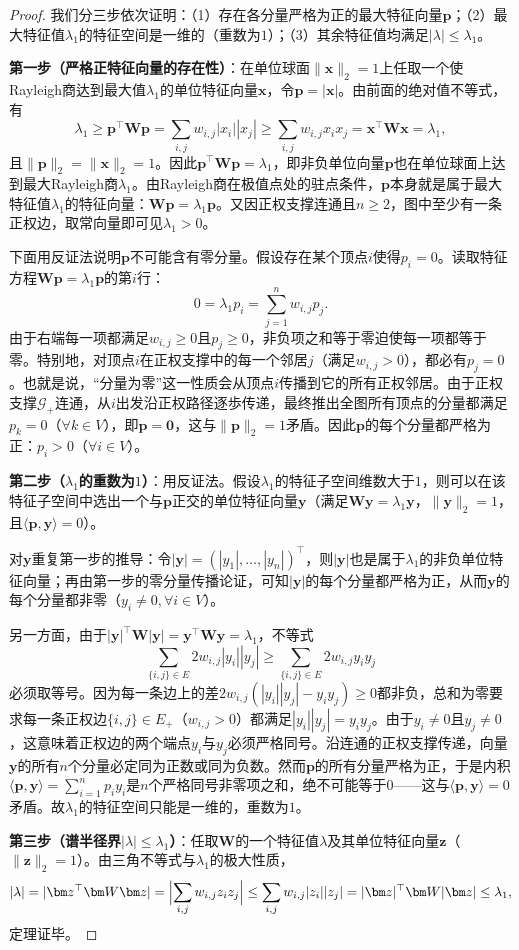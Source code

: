 \begin{proof}
我们分三步依次证明：（1）存在各分量严格为正的最大特征向量$\bm p$；（2）最大特征值$\lambda_1$的特征空间是一维的（重数为$1$）；（3）其余特征值均满足$|\lambda|\leq\lambda_1$。

\textbf{第一步（严格正特征向量的存在性）}：在单位球面$\|\bm x\|_2=1$上任取一个使Rayleigh商达到最大值$\lambda_1$的单位特征向量$\bm x$，令$\bm p=|\bm x|$。由前面的绝对值不等式，有
\[
\lambda_1\geq\bm p^\top\bm W\bm p
=\sum_{i,j}w_{i,j}|x_i||x_j|
\geq\sum_{i,j}w_{i,j}x_i x_j
=\bm x^\top\bm W\bm x=\lambda_1,
\]
且$\|\bm p\|_2=\|\bm x\|_2=1$。因此$\bm p^\top\bm W\bm p=\lambda_1$，即非负单位向量$\bm p$也在单位球面上达到最大Rayleigh商$\lambda_1$。由Rayleigh商在极值点处的驻点条件，$\bm p$本身就是属于最大特征值$\lambda_1$的特征向量：$\bm W\bm p=\lambda_1\bm p$。又因正权支撑连通且$n\geq 2$，图中至少有一条正权边，取常向量即可见$\lambda_1>0$。

下面用反证法说明$\bm p$不可能含有零分量。假设存在某个顶点$i$使得$p_i=0$。读取特征方程$\bm W\bm p=\lambda_1\bm p$的第$i$行：
\[
0=\lambda_1 p_i=\sum_{j=1}^n w_{i,j}p_j.
\]
由于右端每一项都满足$w_{i,j}\geq 0$且$p_j\geq 0$，非负项之和等于零迫使每一项都等于零。特别地，对顶点$i$在正权支撑中的每一个邻居$j$（满足$w_{i,j}>0$），都必有$p_j=0$。也就是说，“分量为零”这一性质会从顶点$i$传播到它的所有正权邻居。由于正权支撑$\mathcal G_+$连通，从$i$出发沿正权路径逐歩传递，最终推出全图所有顶点的分量都满足$p_k=0$（$\forall k\in V$），即$\bm p=\bm 0$，这与$\|\bm p\|_2=1$矛盾。因此$\bm p$的每个分量都严格为正：$p_i>0$（$\forall i\in V$）。

\textbf{第二步（$\lambda_1$的重数为$1$）}：用反证法。假设$\lambda_1$的特征子空间维数大于$1$，则可以在该特征子空间中选出一个与$\bm p$正交的单位特征向量$\bm y$（满足$\bm W\bm y=\lambda_1\bm y$，$\|\bm y\|_2=1$，且$\langle\bm p,\bm y\rangle=0$）。

对$\bm y$重复第一步的推导：令$|\bm y|=(|y_1|,\ldots,|y_n|)^\top$，则$|\bm y|$也是属于$\lambda_1$的非负单位特征向量；再由第一步的零分量传播论证，可知$|\bm y|$的每个分量都严格为正，从而$\bm y$的每个分量都非零（$y_i\neq 0,\forall i\in V$）。

另一方面，由于$|\bm y|^\top\bm W|\bm y|=\bm y^\top\bm W\bm y=\lambda_1$，不等式
\[
\sum_{\{i,j\}\in E}2w_{i,j}|y_i||y_j|
\geq\sum_{\{i,j\}\in E}2w_{i,j}y_i y_j
\]
必须取等号。因为每一条边上的差$2w_{i,j}(|y_i||y_j|-y_i y_j)\geq 0$都非负，总和为零要求每一条正权边$\{i,j\}\in E_+$（$w_{i,j}>0$）都满足$|y_i||y_j|=y_i y_j$。由于$y_i\neq 0$且$y_j\neq 0$，这意味着正权边的两个端点$y_i$与$y_j$必须严格同号。沿连通的正权支撑传递，向量$\bm y$的所有$n$个分量必定同为正数或同为负数。然而$\bm p$的所有分量严格为正，于是内积$\langle\bm p,\bm y\rangle=\sum_{i=1}^n p_i y_i$是$n$个严格同号非零项之和，绝不可能等于$0$——这与$\langle\bm p,\bm y\rangle=0$矛盾。故$\lambda_1$的特征空间只能是一维的，重数为$1$。

\textbf{第三步（谱半径界$|\lambda|\leq\lambda_1$）}：任取$\bm W$的一个特征值$\lambda$及其单位特征向量$\bm z$（$\|\bm z\|_2=1$）。由三角不等式与$\lambda_1$的极大性质，
\[
|\lambda|
=|\bm z^\top\bm W\bm z|
=\Bigl|\sum_{i,j}w_{i,j}z_i z_j\Bigr|
\leq\sum_{i,j}w_{i,j}|z_i||z_j|
=|\bm z|^\top\bm W|\bm z|
\leq\lambda_1,
\]
定理证毕。
\end{proof}

